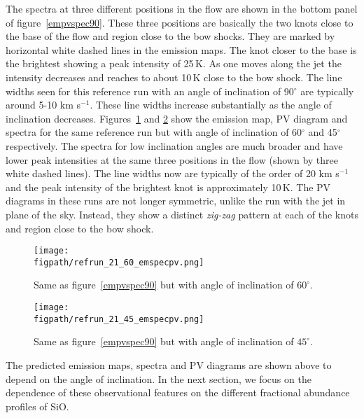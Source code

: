 \documentclass[useAMS,usenatbib]{mn2e}
\newcommand{\figpath}{PFIGS/}
\begin{document}
The spectra at three different positions in the flow are shown in the
bottom panel of figure~\ref{empvspec90}. These three positions are
basically the two knots close to the base of the flow and region close
to the bow shocks. They are marked by horizontal white dashed lines in
the emission maps. The knot closer to the base is the brightest
showing a peak intensity of 25\,K. As one moves along the jet the
intensity decreases and reaches to about 10\,K close to the bow shock.
The line widths seen for this reference run with an angle of
inclination of 90$^{\circ}$ are typically around 5-10 km s$^{-1}$.
These line widths increase substantially as the angle of inclination
decreases. Figures~\ref{empvspec60} and \ref{empvspec45} show the
emission map, PV diagram and spectra for the same reference run but
with angle of inclination of 60$^{\circ}$ and 45$^{\circ}$
respectively. The spectra for low inclination angles are much broader
and have lower peak intensities at the same three positions in the flow (shown by
three white dashed lines). The line 
widths now are typically of the order of 20 km s$^{-1}$ and the peak
intensity of the brightest knot is approximately 10\,K. 
The PV diagrams in these runs are not longer symmetric, unlike the run
with the jet in plane of the sky. Instead, they show a distinct {\it zig-zag}
pattern at each of the knots and region close to the bow shock.


\begin{figure}
 \texttt{[image: \\figpath/refrun\_21\_60\_emspecpv.png]}
 \caption{Same as figure~\ref{empvspec90} but with angle of
   inclination of $60^{\circ}$.} 
\label{empvspec60}
\end{figure}

\begin{figure}
 \texttt{[image: \\figpath/refrun\_21\_45\_emspecpv.png]}
 \caption{Same as figure~\ref{empvspec90} but with angle of
   inclination of $45^{\circ}$.} 
\label{empvspec45}
\end{figure}

%
The predicted emission maps, spectra and PV diagrams are shown above to depend
on the angle of inclination. In the next section, we focus on the
dependence of these observational features on the 
different fractional abundance profiles of SiO.
\end{document}
